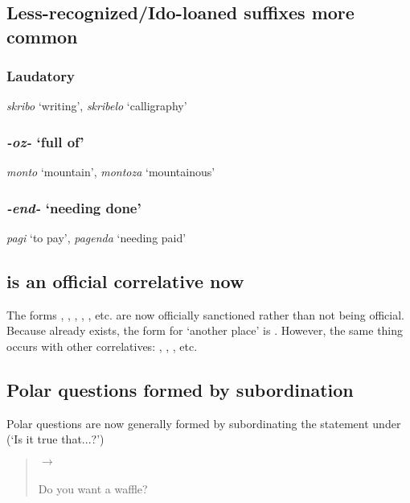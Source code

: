\subsection{Less-recognized/Ido-loaned suffixes more common}

\subsubsection{Laudatory }

\textit{skribo} `writing', \textit{skribelo} `calligraphy'

\subsubsection{\textit{-oz-} `full of'}

\textit{monto} `mountain', \textit{montoza} `mountainous'

\subsubsection{\textit{-end-} `needing done'}

\textit{pagi} `to pay', \textit{pagenda} `needing paid'

\subsection{ is an official correlative now}

The forms , , , ,  , etc. are now officially sanctioned rather than not being official. Because  already exists, the form for `another place' is . However, the same thing occurs with other correlatives: , , , etc.

\subsection{Polar questions formed by subordination}

Polar questions are now generally formed by subordinating the statement under  (`Is it true that...?')

\begin{quote}
 $\to$\\
\\
Do you want a waffle?
\end{quote}

